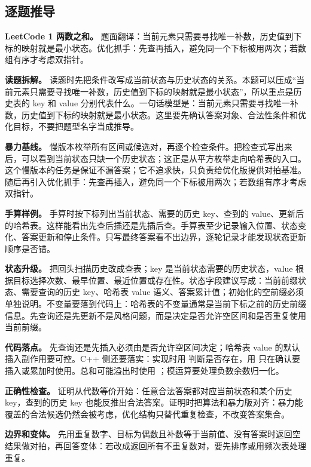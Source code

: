 \subsection{逐题推导}

\noindent\textbf{LeetCode 1 两数之和。} 题面翻译：当前元素只需要寻找唯一补数，历史值到下标的映射就是最小状态。优化抓手：先查再插入，避免同一个下标被用两次；若数组有序才考虑双指针。

\textbf{读题拆解。} 读题时先把条件改写成当前状态与历史状态的关系。本题可以压成“当前元素只需要寻找唯一补数，历史值到下标的映射就是最小状态”，所以重点是历史表的 key 和 value 分别代表什么。一句话模型是：当前元素只需要寻找唯一补数，历史值到下标的映射就是最小状态。这里要先确认答案对象、合法性条件和优化目标，不要把题型名字当成推导。

\textbf{暴力基线。} 慢版本枚举所有区间或候选对，再逐个检查条件。把检查式写出来后，可以看到当前状态只缺一个历史状态；这正是从平方枚举走向哈希表的入口。这个慢版本的任务是保证不漏答案；它不追求快，只负责给优化版提供对拍基准。随后再引入优化抓手：先查再插入，避免同一个下标被用两次；若数组有序才考虑双指针。

\textbf{手算样例。} 手算时按下标列出当前状态、需要的历史 key、查到的 value、更新后的哈希表。这样能看出先查后插还是先插后查。手算表至少记录输入位置、状态变化、答案更新和停止条件。只写最终答案看不出边界，逐轮记录才能发现状态更新顺序是否错。

\textbf{状态升级。} 把回头扫描历史改成查表；key 是当前状态需要的历史状态，value 根据目标选择次数、最早位置、最近位置或存在性。状态字段建议写成：当前前缀状态、需要查询的历史 key、哈希表 value 语义、答案累计值；初始化的空前缀必须单独说明。不变量要落到代码上：哈希表的不变量通常是当前下标之前的历史前缀信息。先查询还是先更新不是风格问题，而是决定是否允许空区间和是否重复使用当前前缀。

\textbf{代码落点。} 先查询还是先插入必须由是否允许空区间决定；哈希表 value 的默认插入副作用要可控。C++ 侧还要落实：实现时用  判断是否存在，用  只在确认要插入或累加时使用。总和可能溢出时使用 ；模运算要处理负数余数归一化。

\textbf{正确性检查。} 证明从代数等价开始：任意合法答案都对应当前状态和某个历史 key，查到的历史 key 也能反推出合法答案。证明时把算法和暴力版对齐：暴力能覆盖的合法候选仍然会被考虑，优化结构只替代重复检查，不改变答案集合。

\textbf{边界和变体。} 先用重复数字、目标为偶数且补数等于当前值、没有答案时返回空结果做对拍，再回答变体：若改成返回所有不重复数对，要先排序或用频次表处理重复。

